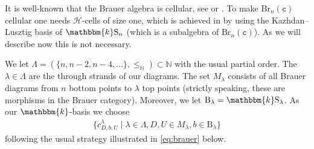 \documentclass[a4paper,11pt]{amsart}
\renewcommand{\dots}{\text{...}}
\newcommand{\setstuff}[1]{\mathrm{#1}}
\newcommand{\KK}{\mathbbm{k}}
\newcommand{\N}{\mathbb{N}}
\newcommand{\varsym}[1]{\mathtt{#1}}
\newcommand{\cvar}{\varsym{c}}
\numberwithin{equation}{section}
\begin{document}
It is well-known that the Brauer algebra is cellular, see 
\cite[Section 4]{GrLe-cellular} or \cite[Section 5]{AnStTu-cellular-tilting}. 
To make $\setstuff{Br}_{n}(\cvar)$ cellular one needs 
$\mathcal{H}$-cells of size one, which is achieved in 
\cite[Section 4]{GrLe-cellular} by using the Kazhdan--Lusztig 
basis of $\KK\setstuff{S}_{n}$ (which is 
a subalgebra of $\setstuff{Br}_{n}(\cvar)$).
As we will describe now this is not necessary.

We let $\Lambda=(\{n,n-2,n-4,\dots\},\leq_{\N})\subset\N$ 
with the usual partial order.
The $\lambda\in\Lambda$ are the through strands of our diagrams.
The set $M_{\lambda}$ consists of all Brauer diagrams 
from $n$ bottom points to $\lambda$ top points (strictly speaking, 
these are morphisms in the Brauer category).
Moreover, we let $\setstuff{B}_{\lambda}=\KK\setstuff{S}_{\lambda}$.
As our $\KK$-basis we choose 
\begin{gather}\label{eq:brauer-basis}
\{c_{D,b,U}^{\lambda}\mid\lambda\in\Lambda,D,U\in M_{\lambda},
b\in\setstuff{B}_{\lambda}\}
\end{gather}
following the usual strategy illustrated in \eqref{eq:brauer} below. 
\end{document}
